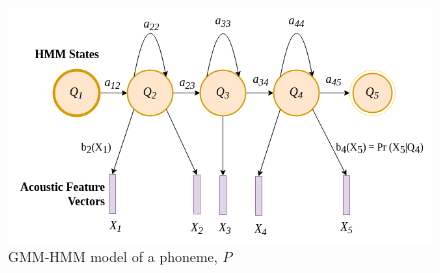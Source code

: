 

\begin{figure}[ht]
	\begin{center}
		\includegraphics[width=0.8\linewidth]{gmm-hmm.png}
		\caption{GMM-HMM model of a phoneme, $P$}
		\label{fig:gmm-hmm}
	\end{center}
\end{figure}

